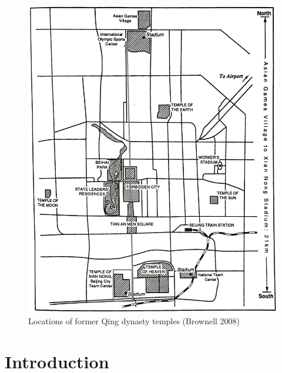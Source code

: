 \begin{figure}[htbp]
  \includegraphics[width = \linewidth]{images/beijingTemplesXNT.png}
  \caption{Locations of former Qing dynasty temples (Brownell 2008)}
  \label{fig:beijingTemplesXNT}
\end{figure}




\section{Introduction}

